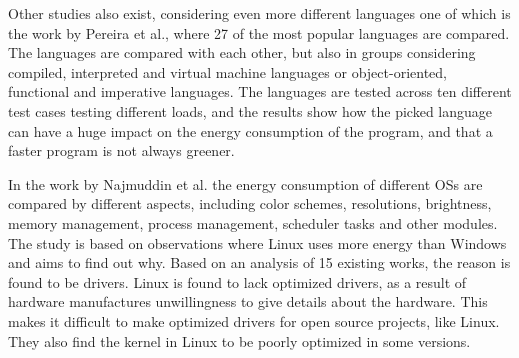 Other studies also exist, considering even more different languages one of which is the work by Pereira et al.\cite[]{Pereira2017}, where 27 of the most popular languages are compared. The languages are compared with each other, but also in groups considering compiled, interpreted and virtual machine languages or object-oriented, functional and imperative languages. The languages are tested across ten different test cases testing different loads, and the results show how the picked language can have a huge impact on the energy consumption of the program, and that a faster program is not always greener.\newline

In the work by Najmuddin et al.\cite[]{Najmuddin2021} the energy consumption of different OSs are compared by different aspects, including color schemes, resolutions, brightness, memory management, process management, scheduler tasks and other modules. The study is based on observations where Linux uses more energy than Windows and aims to find out why. Based on an analysis of 15 existing works, the reason is found to be drivers. Linux is found to lack optimized drivers, as a result of hardware manufactures unwillingness to give details about the hardware. This makes it difficult to make optimized drivers for open source projects, like Linux. They also find the kernel in Linux to be poorly optimized in some versions.